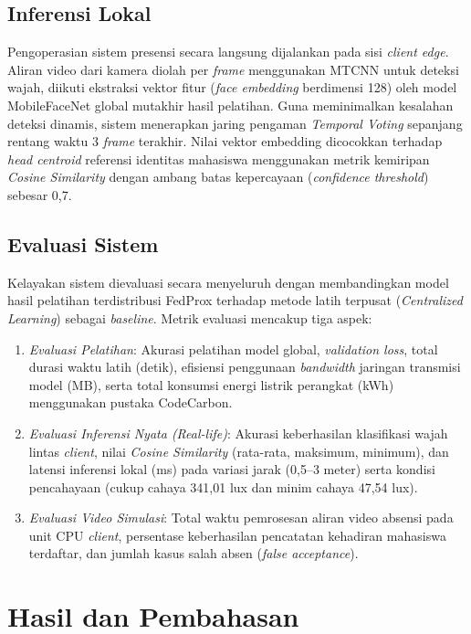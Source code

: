 \documentclass[conference]{IEEEtran}
\begin{document}
\subsection{Inferensi Lokal}
Pengoperasian sistem presensi secara langsung dijalankan pada sisi \textit{client edge}. Aliran video dari kamera diolah per \textit{frame} menggunakan MTCNN untuk deteksi wajah, diikuti ekstraksi vektor fitur (\textit{face embedding} berdimensi 128) oleh model MobileFaceNet global mutakhir hasil pelatihan. Guna meminimalkan kesalahan deteksi dinamis, sistem menerapkan jaring pengaman \textit{Temporal Voting} sepanjang rentang waktu 3 \textit{frame} terakhir. Nilai vektor embedding dicocokkan terhadap \textit{head centroid} referensi identitas mahasiswa menggunakan metrik kemiripan \textit{Cosine Similarity} dengan ambang batas kepercayaan (\textit{confidence threshold}) sebesar 0,7.

\subsection{Evaluasi Sistem}
Kelayakan sistem dievaluasi secara menyeluruh dengan membandingkan model hasil pelatihan terdistribusi FedProx terhadap metode latih terpusat (\textit{Centralized Learning}) sebagai \textit{baseline}. Metrik evaluasi mencakup tiga aspek:
\begin{enumerate}
    \item \textit{Evaluasi Pelatihan}: Akurasi pelatihan model global, \textit{validation loss}, total durasi waktu latih (detik), efisiensi penggunaan \textit{bandwidth} jaringan transmisi model (MB), serta total konsumsi energi listrik perangkat (kWh) menggunakan pustaka CodeCarbon.
    \item \textit{Evaluasi Inferensi Nyata (Real-life)}: Akurasi keberhasilan klasifikasi wajah lintas \textit{client}, nilai \textit{Cosine Similarity} (rata-rata, maksimum, minimum), dan latensi inferensi lokal (ms) pada variasi jarak (0,5--3 meter) serta kondisi pencahayaan (cukup cahaya 341,01 lux dan minim cahaya 47,54 lux).
    \item \textit{Evaluasi Video Simulasi}: Total waktu pemrosesan aliran video absensi pada unit CPU \textit{client}, persentase keberhasilan pencatatan kehadiran mahasiswa terdaftar, dan jumlah kasus salah absen (\textit{false acceptance}).
\end{enumerate}

\section{Hasil dan Pembahasan}
\end{document}
